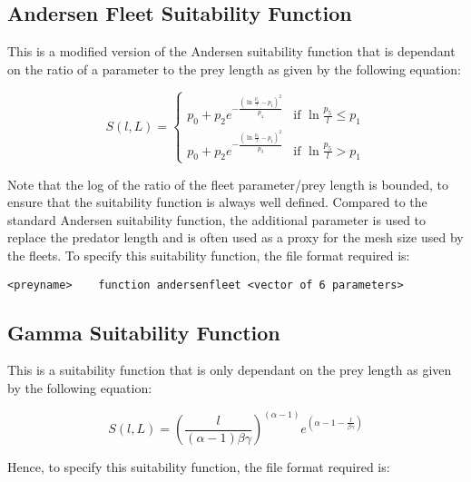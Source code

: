 \documentclass[]{book}
\begin{document}
\hypertarget{andersen-fleet-suitability-function}{%
\subsection{Andersen Fleet Suitability Function}\label{andersen-fleet-suitability-function}}

This is a modified version of the Andersen suitability function that is
dependant on the ratio of a parameter to the prey length as given by the
following equation:

\begin{equation}
\label{eq:andersenfleetsuit}
S(l, L) =
\begin{cases}
p_0 + p_2e^{-\frac{(\ln\frac{p_5}{l} - p_1)^2}{p_4}} & \textrm{if $\ln\frac{p_5}{l} \leq p_1$} \\
p_0 + p_2e^{-\frac{(\ln\frac{p_5}{l} - p_1)^2}{p_3}} & \textrm{if $\ln\frac{p_5}{l} > p_1$}
\end{cases}\end{equation}

Note that the log of the ratio of the fleet parameter/prey length is
bounded, to ensure that the suitability function is always well defined.
Compared to the standard Andersen suitability function, the additional
parameter is used to replace the predator length and is often used as a
proxy for the mesh size used by the fleets. To specify this suitability
function, the file format required is:

\begin{verbatim}
<preyname>    function andersenfleet <vector of 6 parameters>
\end{verbatim}

\hypertarget{gamma-suitability-function}{%
\subsection{Gamma Suitability Function}\label{gamma-suitability-function}}

This is a suitability function that is only dependant on the prey length
as given by the following equation:

\begin{equation}
\label{eq:gammasuit}
S(l, L) = \left(\frac{l}{(\alpha - 1) \beta\gamma}\right) ^ {(\alpha - 1)}e ^ {(\alpha - 1 - \frac{l}{\beta\gamma})}\end{equation}

Hence, to specify this suitability function, the file format required
is:
\end{document}
